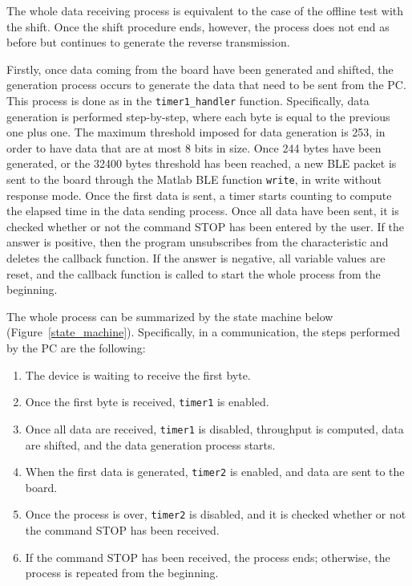 \documentclass{Configuration_Files/PoliMi3i_thesis}
\begin{document}
The whole data receiving process is equivalent to the case of the offline test with the shift. Once the shift procedure ends, however, the process does not end as before but continues to generate the reverse transmission.

Firstly, once data coming from the board have been generated and shifted, the generation process occurs to generate the data that need to be sent from the PC. This process is done as in the \texttt{timer1\_handler} function. Specifically, data generation is performed step-by-step, where each byte is equal to the previous one plus one. The maximum threshold imposed for data generation is 253, in order to have data that are at most 8 bits in size. Once 244 bytes have been generated, or the 32400 bytes threshold has been reached, a new BLE packet is sent to the board through the Matlab BLE function \texttt{write}, in write without response mode. Once the first data is sent, a timer starts counting to compute the elapsed time in the data sending process. Once all data have been sent, it is checked whether or not the command STOP has been entered by the user. If the answer is positive, then the program unsubscribes from the characteristic and deletes the callback function. If the answer is negative, all variable values are reset, and the callback function is called to start the whole process from the beginning.

The whole process can be summarized by the state machine below (Figure~\ref{state_machine}). Specifically, in a communication, the steps performed by the PC are the following:

\begin{enumerate}
    \item The device is waiting to receive the first byte.
    \item Once the first byte is received, \texttt{timer1} is enabled.
    \item Once all data are received, \texttt{timer1} is disabled, throughput is computed, data are shifted, and the data generation process starts.
    \item When the first data is generated, \texttt{timer2} is enabled, and data are sent to the board.
    \item Once the process is over, \texttt{timer2} is disabled, and it is checked whether or not the command STOP has been received.
    \item If the command STOP has been received, the process ends; otherwise, the process is repeated from the beginning.
\end{enumerate}
\end{document}
